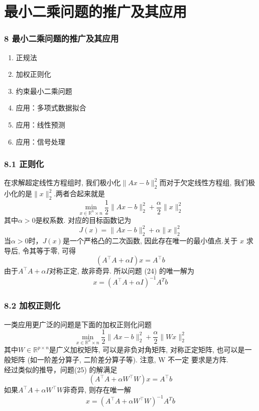 \documentclass[notheorems,serif]{beamer}
\begin{document}
\section{最小二乘问题的推广及其应用}
\begin{frame}
\frametitle{8 最小二乘问题的推广及其应用}
\begin{enumerate}[8.1]
	\item 正规法
	\item 加权正则化
	\item 约束最小二乘问题
	\item 应用：多项式数据拟合
	\item 应用：线性预测
	\item 应用：信号处理
\end{enumerate}
\end{frame}

\begin{frame}
\frametitle{8.1 正则化}
在求解超定线性方程组时, 我们极小化$\|A x-b\|_{2}^{2}$而对于欠定线性方程组, 我们极小化的是$\|x\|_{2}^{2}$.两者合起来就是
\begin{equation}
\min _{x \in \mathbb{R}^{n} \times n} \frac{1}{2}\|A x-b\|_{2}^{2}+\frac{\alpha}{2}\|x\|_{2}^{2}
\end{equation}
其中$\alpha>0$是权系数. 对应的目标函数记为
$$
J(x)=\|A x-b\|_{2}^{2}+\alpha\|x\|_{2}^{2}
$$
当$\alpha>0$时，$J(x)$是一个严格凸的二次函数, 因此存在唯一的最小值点.关于 $x$ 求导后, 令其等于零, 可得
$$
\left(A^{\top} A+\alpha I\right) x=A^{\top} b
$$
由于$A^{\top} A+\alpha I$对称正定, 故非奇异. 所以问题 (24) 的唯一解为
$$
x=\left(A^{\top} A+\alpha I\right)^{-1} A^{T} b
$$
\end{frame}

\begin{frame}
\frametitle{8.2 加权正则化}
一类应用更广泛的问题是下面的加权正则化问题
\begin{equation}
\min _{x \in \mathbb{R}^{n} \times n} \frac{1}{2}\|A x-b\|_{2}^{2}+\frac{\alpha}{2}\|W x\|_{2}^{2}
\end{equation}
其中$W \in \mathbb{R}^{p \times n}$是广义加权矩阵, 可以是非负对角矩阵, 对称正定矩阵, 也可以是一般矩阵 (如一阶差分算子, 二阶差分算子等). 注意, W 不一定 要求是方阵.\\
经过类似的推导，问题(25) 的解满足
$$
\left(A^{\top} A+\alpha W^{\top} W\right) x=A^{\top} b
$$
如果$A^{\top} A+\alpha W^{\top} W$非奇异, 则存在唯一解
$$
x=\left(A^{\top} A+\alpha W^{\top} W\right)^{-1} A^{T} b
$$
\end{frame}
\end{document}
